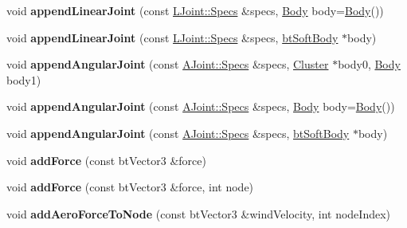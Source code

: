 \begin{DoxyCompactItemize}
\item 
\mbox{\label{classbtSoftBody_a6f60720a468c4734aef16440c794c9cc}} 
void {\bfseries append\+Linear\+Joint} (const \hyperlink{structbtSoftBody_1_1LJoint_1_1Specs}{L\+Joint\+::\+Specs} \&specs, \hyperlink{structbtSoftBody_1_1Body}{Body} body=\hyperlink{structbtSoftBody_1_1Body}{Body}())
\item 
\mbox{\label{classbtSoftBody_a573a55a32496e60563cd5d9f6a41edc0}} 
void {\bfseries append\+Linear\+Joint} (const \hyperlink{structbtSoftBody_1_1LJoint_1_1Specs}{L\+Joint\+::\+Specs} \&specs, \hyperlink{classbtSoftBody}{bt\+Soft\+Body} $\ast$body)
\item 
\mbox{\label{classbtSoftBody_a76633cd436f4de0204f1d1e483c0a2e3}} 
void {\bfseries append\+Angular\+Joint} (const \hyperlink{structbtSoftBody_1_1AJoint_1_1Specs}{A\+Joint\+::\+Specs} \&specs, \hyperlink{structbtSoftBody_1_1Cluster}{Cluster} $\ast$body0, \hyperlink{structbtSoftBody_1_1Body}{Body} body1)
\item 
\mbox{\label{classbtSoftBody_afbacb266e17f8b785985cb3f85be7f51}} 
void {\bfseries append\+Angular\+Joint} (const \hyperlink{structbtSoftBody_1_1AJoint_1_1Specs}{A\+Joint\+::\+Specs} \&specs, \hyperlink{structbtSoftBody_1_1Body}{Body} body=\hyperlink{structbtSoftBody_1_1Body}{Body}())
\item 
\mbox{\label{classbtSoftBody_ae39c309cd794ce277964808a5d20d1d9}} 
void {\bfseries append\+Angular\+Joint} (const \hyperlink{structbtSoftBody_1_1AJoint_1_1Specs}{A\+Joint\+::\+Specs} \&specs, \hyperlink{classbtSoftBody}{bt\+Soft\+Body} $\ast$body)
\item 
\mbox{\label{classbtSoftBody_a4d4cb25a0b61eee260bda46bca373960}} 
void {\bfseries add\+Force} (const bt\+Vector3 \&force)
\item 
\mbox{\label{classbtSoftBody_afdfb3e29c73cb1a67a0d006eb1e1824d}} 
void {\bfseries add\+Force} (const bt\+Vector3 \&force, int node)
\item 
\mbox{\label{classbtSoftBody_a8823d4ca2ab76dd723d8d57a9785e716}} 
void {\bfseries add\+Aero\+Force\+To\+Node} (const bt\+Vector3 \&wind\+Velocity, int node\+Index)

\end{DoxyCompactItemize}
